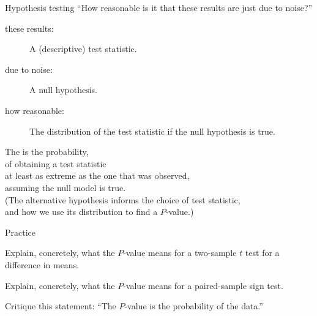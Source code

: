 \begin{frame}{Hypothesis testing}
    \alert{``How reasonable is it that these results are just due to noise?''}

    \begin{description}
        \item[these results:] A (descriptive) test statistic.  
        \item[due to noise:] A null hypothesis.
        \item[how reasonable:] The distribution of the test statistic if the null hypothesis is true. 
    \end{description}

    \vspace{2em}
    \pause

    The  is the probability, \\
    of obtaining a test statistic \\
    at least as extreme as the one that was observed,\\
    assuming the null model is true. \\

    \vspace{2em}
    \pause
    (The alternative hypothesis informs the choice of test statistic,\\
    and how we use its distribution to find a $P$-value.)

\end{frame}

\begin{frame}{Practice}

    Explain, concretely, what the $P$-value means for a two-sample $t$ test
    for a difference in means.
    \vfill

    Explain, concretely, what the $P$-value means for a paired-sample sign test.
    \vfill

    Critique this statement: ``The $P$-value is the probability of the data.''
    \vfill
    
\end{frame}
    
